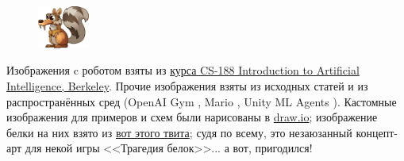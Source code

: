 \begin{figure}
\vspace{-0.5cm}
\centering
\includegraphics[width=0.15\textwidth]{Images/Scrat.png}
\vspace{-0.5cm}
\end{figure}

Изображения c роботом взяты из \href{https://inst.eecs.berkeley.edu/~cs188/fa20/}{курса CS-188 Introduction to Artificial Intelligence, Berkeley}. Прочие изображения взяты из исходных статей и из распространённых сред (OpenAI Gym \cite{brockman2016openai}, Mario \cite{gym-super-mario-bros}, Unity ML Agents \cite{juliani2018unity}). Кастомные изображения для примеров и схем были нарисованы в \href{https://www.draw.io/}{draw.io}; изображение белки на них взято из \href{https://twitter.com/racefornuts/status/690043558208913408}{вот этого твита}; судя по всему, это незаюзанный концепт-арт для некой игры <<Трагедия белок>>... а вот, пригодился!


